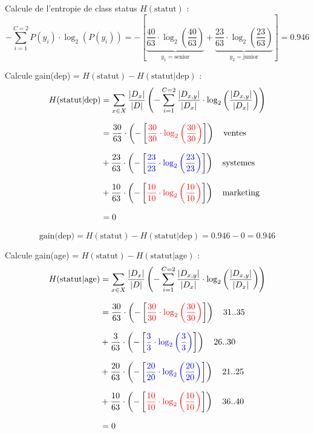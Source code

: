 \documentclass{article}
\begin{document}
\vspace{0.45cm}
Calcule de l'entropie de class status $H(\text{statut})$ :
\[ - \sum_{i=1}^{C=2} P(y_i) \cdot \log_2\left( P(y_i)\right) = - \left[\underbrace{\dfrac{40}{63} \cdot \log_2\left(\dfrac{40}{63}\right)}_{y_1 = \text{senior}} + \underbrace{\dfrac{23}{63} \cdot \log_2\left(\dfrac{23}{63}\right)}_{y_2  = \text{junior}}\right]  = 0.946\]

\vspace{0.45cm}

Calcule gain(dep) = $H(\text{statut}) - H(\text{statut} | \text{dep})$ :
\begin{align*}
    H(\text{statut} | \text{dep}) &= \sum_{x\in X} \dfrac{|D_x|}{|D|} \left( - \sum_{i=1} ^{C=2} \dfrac{|D_{x,y}|}{|D_x|} \cdot \log_2 \left( \dfrac{|D_{x,y}|}{|D_x|} \right) \right)\\[0.25cm]
                                  &= \dfrac{30}{63} \cdot \left( - \left[ \textcolor{red}{\dfrac{30}{30} \cdot \log_2\left (\dfrac{30}{30} \right)} \right]  \right) \quad \text{ventes}\\[0.25cm]
                                  &+ \dfrac{23}{63} \cdot \left( - \left[ \textcolor{blue}{\dfrac{23}{23} \cdot \log_2\left (\dfrac{23}{23} \right)} \right]  \right) \quad \text{systemes}\\[0.25cm]
                                  &+ \dfrac{10}{63} \cdot \left( - \left[ \textcolor{red}{\dfrac{10}{10} \cdot \log_2\left (\dfrac{10}{10} \right)}  \right]  \right) \quad \text{marketing}\\[0.25cm]
                                  & = 0
\end{align*}

\[\text{gain(dep)} = H(\text{statut}) - H(\text{statut} | \text{dep}) = 0.946 - 0 = 0.946\]

\newpage

Calcule gain(age) = $H(\text{statut}) - H(\text{statut} | \text{age})$ :
\begin{align*}
    H(\text{statut} | \text{age}) &= \sum_{x\in X} \dfrac{|D_x|}{|D|} \left( - \sum_{i=1} ^{C=2} \dfrac{|D_{x,y}|}{|D_x|} \cdot \log_2 \left( \dfrac{|D_{x,y}|}{|D_x|} \right) \right)\\[0.25cm]
                                  &= \dfrac{30}{63} \cdot \left( - \left[  \textcolor{red}{\dfrac{30}{30} \cdot \log_2\left (\dfrac{30}{30} \right)} \right]  \right) \quad \text{31..35}\\[0.25cm]
                                  &+ \dfrac{3}{63} \cdot \left( - \left[ \textcolor{blue}{\dfrac{3}{3} \cdot \log_2\left (\dfrac{3}{3} \right)} \right]  \right) \quad \text{26..30}\\[0.25cm]
                                  &+ \dfrac{20}{63} \cdot \left( - \left[ \textcolor{blue}{\dfrac{20}{20} \cdot \log_2\left (\dfrac{20}{20} \right)}  \right]  \right) \quad \text{21..25}\\[0.25cm]
                                  &+ \dfrac{10}{63} \cdot \left( - \left[ \textcolor{red}{\dfrac{10}{10} \cdot \log_2\left (\dfrac{10}{10} \right)}  \right]  \right) \quad \text{36..40}\\[0.25cm]
                                  & = 0
\end{align*}
\end{document}
